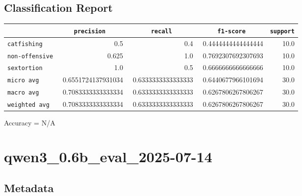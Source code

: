 \documentclass{article}
\begin{document}
\subsection{Classification Report}

\begin{center}
\begin{tabular}{l | r | r | r | r} \hline
    \verb|            | & \verb|    precision     | & \verb|      recall      | & \verb|     f1-score     | & \verb|support| \\ \hline
    \hline
    \verb|catfishing | & 0.5 & 0.4 & 0.4444444444444444 &    10.0 \\ \hline
    \verb|non-offensive| & 0.625 & 1.0 & 0.7692307692307693 &    10.0 \\ \hline
    \verb|sextortion | & 1.0 & 0.5 & 0.6666666666666666 &    10.0 \\ \hline
    \verb|micro avg  | & 0.6551724137931034 & 0.6333333333333333 & 0.6440677966101694 &    30.0 \\ \hline
    \verb|macro avg  | & 0.7083333333333334 & 0.6333333333333333 & 0.6267806267806267 &    30.0 \\ \hline
    \verb|weighted avg| & 0.7083333333333334 & 0.6333333333333333 & 0.6267806267806267 &    30.0 \\ \hline
\end{tabular}
\end{center}

\begin{center}
Accuracy = N/A
\end{center}

\section{qwen3\_0.6b\_eval\_2025-07-14}
\subsection{Metadata}
\end{document}

